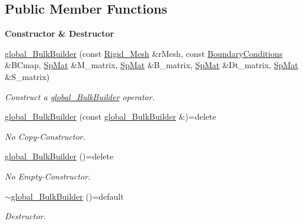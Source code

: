 \subsection*{Public Member Functions}
\begin{Indent}{\bf Constructor \& Destructor}\par
\begin{DoxyCompactItemize}
\item 
\hyperlink{classFVCode3D_1_1global__BulkBuilder_a577c30e2648795836551aa1e914f6606}{global\+\_\+\+Bulk\+Builder} (const \hyperlink{classFVCode3D_1_1Rigid__Mesh}{Rigid\+\_\+\+Mesh} \&r\+Mesh, const \hyperlink{classFVCode3D_1_1BoundaryConditions}{Boundary\+Conditions} \&B\+Cmap, \hyperlink{namespaceFVCode3D_ac1032289d96638cf0ad6c52ef639095f}{Sp\+Mat} \&M\+\_\+matrix, \hyperlink{namespaceFVCode3D_ac1032289d96638cf0ad6c52ef639095f}{Sp\+Mat} \&B\+\_\+matrix, \hyperlink{namespaceFVCode3D_ac1032289d96638cf0ad6c52ef639095f}{Sp\+Mat} \&Dt\+\_\+matrix, \hyperlink{namespaceFVCode3D_ac1032289d96638cf0ad6c52ef639095f}{Sp\+Mat} \&S\+\_\+matrix)
\begin{DoxyCompactList}\small\item\em Construct a \hyperlink{classFVCode3D_1_1global__BulkBuilder}{global\+\_\+\+Bulk\+Builder} operator. \end{DoxyCompactList}\item 
\hyperlink{classFVCode3D_1_1global__BulkBuilder_aae7059326cb1624707c63140519af09b}{global\+\_\+\+Bulk\+Builder} (const \hyperlink{classFVCode3D_1_1global__BulkBuilder}{global\+\_\+\+Bulk\+Builder} \&)=delete
\begin{DoxyCompactList}\small\item\em No Copy-\/\+Constructor. \end{DoxyCompactList}\item 
\hyperlink{classFVCode3D_1_1global__BulkBuilder_ab40d25404a0806eb13ccfa3841dd75cb}{global\+\_\+\+Bulk\+Builder} ()=delete
\begin{DoxyCompactList}\small\item\em No Empty-\/\+Constructor. \end{DoxyCompactList}\item 
\hyperlink{classFVCode3D_1_1global__BulkBuilder_abdbb9410f1df954bccb78568aa9a9cae}{$\sim$global\+\_\+\+Bulk\+Builder} ()=default
\begin{DoxyCompactList}\small\item\em Destructor. \end{DoxyCompactList}\end{DoxyCompactItemize}
\end{Indent}
